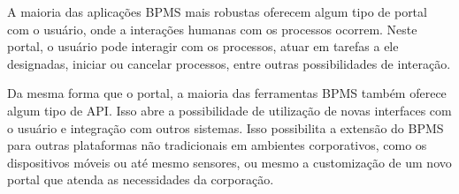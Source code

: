 A maioria das aplicações BPMS mais robustas oferecem algum tipo de portal com o usuário, onde a interações humanas com os processos ocorrem. Neste portal, o usuário pode interagir com os processos, atuar em tarefas a ele designadas, iniciar ou cancelar processos, entre outras possibilidades de interação.

Da mesma forma que o portal, a maioria das ferramentas BPMS também oferece algum tipo de API. Isso abre a possibilidade de utilização de novas interfaces com o usuário e integração com outros sistemas. Isso possibilita a extensão do BPMS para outras plataformas não tradicionais em ambientes corporativos, como os dispositivos móveis ou até mesmo sensores, ou mesmo a customização de um novo portal que atenda as necessidades da corporação.



